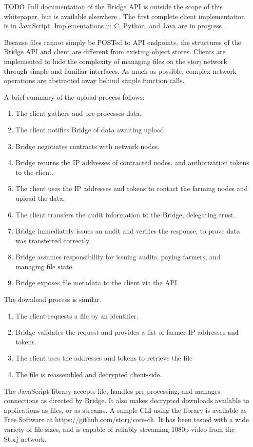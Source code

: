 \documentclass[a4paper,10pt]{article}
\newcommand{\todo}[1]{{\color{red} TODO #1}}
\begin{document}
\todo{
Full documentation of the Bridge API is outside the scope of this whitepaper,
but is available elsewhere \cite{16}. The first complete client implementation
is in JavaScript. Implementations in C, Python, and Java are in progress.

Because files cannot simply be POSTed to API endpoints, the structures of the
Bridge API and client are different from existing object stores. Clients are
implemented to hide the complexity of managing files on the storj network
through simple and familiar interfaces. As much as possible, complex network
operations are abstracted away behind simple function calls.

A brief summary of the upload process follows:

\begin{enumerate}
\item The client gathers and pre-processes data.
\item The client notifies Bridge of data awaiting upload.
\item Bridge negotiates contracts with network nodes.
\item Bridge returns the IP addresses of contracted nodes, and authorization
tokens to the client.
\item The client uses the IP addresses and tokens to contact the farming nodes
and upload the data.
\item The client transfers the audit information to the Bridge, delegating
trust.
\item Bridge immediately issues an audit and verifies the response, to prove
data was transferred correctly.
\item Bridge assumes responsibility for issuing audits, paying farmers, and
managing file state.
\item Bridge exposes file metadata to the client via the API.
\end{enumerate}

The download process is similar.

\begin{enumerate}
\item The client requests a file by an identifier.
\item Bridge validates the request and provides a list of farmer IP addresses
and tokens.
\item The client uses the addresses and tokens to retrieve the file
\item The file is reassembled and decrypted client-side.
\end{enumerate}

The JavaScript library accepts file, handles pre-processing, and manages
connections as directed by Bridge. It also makes decrypted downloads available
to applications as files, or as streams. A sample CLI using the library is
available as Free Software at https://github.com/storj/core-cli. It has been
tested with a wide variety of file sizes, and is capable of reliably streaming
1080p video from the Storj network.
}
\end{document}
